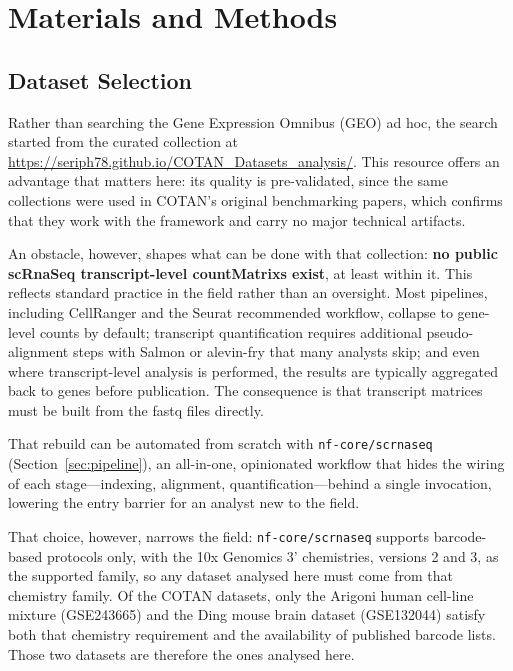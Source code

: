 \chapter{Materials and Methods}\label{chap:methods}

\section{Dataset Selection}

Rather than searching the Gene Expression Omnibus (GEO)\cite{barrett2013geo} ad hoc, the search started from the curated collection at \url{https://seriph78.github.io/COTAN_Datasets_analysis/}. This resource offers an advantage that matters here: its quality is pre-validated, since the same collections were used in COTAN's original benchmarking papers, which confirms that they work with the framework and carry no major technical artifacts.

An obstacle, however, shapes what can be done with that collection: \textbf{no public \gls{scRnaSeq} transcript-level \glspl{countMatrix} exist}, at least within it. This reflects standard practice in the field rather than an oversight. Most pipelines, including CellRanger\cite{zheng2017massively} and the Seurat recommended workflow\cite{hao2024seurat}, collapse to \gls{gene}-level counts by default; transcript quantification requires additional pseudo-alignment steps with Salmon\cite{patro2017salmon} or alevin-fry\cite{he2022alevin} that many analysts skip; and even where transcript-level analysis is performed, the results are typically aggregated back to genes before publication. The consequence is that transcript matrices must be built from the \gls{fastq} files directly.

That rebuild can be automated from scratch with \texttt{nf-core/scrnaseq}\cite{ewels2020nfcore} (Section~\ref{sec:pipeline}), an all-in-one, opinionated workflow that hides the wiring of each stage---indexing, alignment, quantification---behind a single invocation, lowering the entry barrier for an analyst new to the field.

That choice, however, narrows the field: \texttt{nf-core/scrnaseq} supports barcode-based protocols only, with the 10x Genomics\cite{zheng2017massively} 3' chemistries, versions 2 and 3, as the supported family, so any dataset analysed here must come from that chemistry family. Of the COTAN datasets, only the Arigoni human cell-line mixture (GSE243665\cite{arigoni2024benchmark}) and the Ding mouse brain dataset (GSE132044\cite{ding2020systematic}) satisfy both that chemistry requirement and the availability of published barcode lists. Those two datasets are therefore the ones analysed here.

